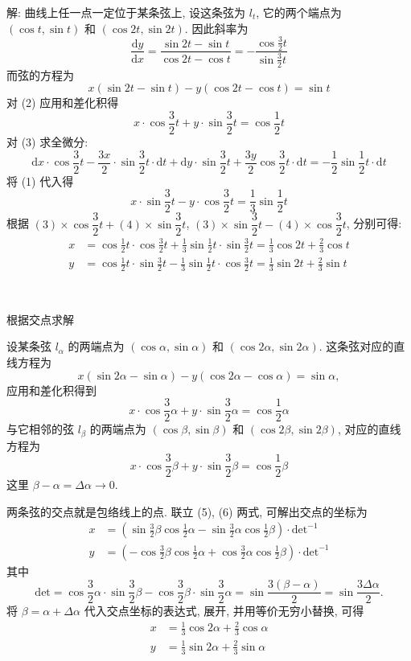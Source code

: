 解: 曲线上任一点一定位于某条弦上, 设这条弦为 $l_t$, 它的两个端点为 $(\cos t, \sin t)$ 和 $(\cos 2t, \sin 2t)$. 因此斜率为
\[ \frac{\mathrm{d}y}{\mathrm{d}x} = \frac{\sin 2t - \sin t}{\cos 2t - \cos t} = -\frac{\cos\frac{3}{2}t}{\sin\frac{3}{2}t} \tag{1}\]
而弦的方程为
\[ x(\sin 2t - \sin t) - y(\cos 2t - \cos t) = \sin t \tag{2} \]
对 (2) 应用和差化积得
\[ x\cdot\cos\frac{3}{2}t + y\cdot\sin\frac{3}{2}t = \cos\frac{1}{2}t \tag{3} \]
对 (3) 求全微分:
\[ \mathrm{d}x\cdot\cos\frac{3}{2}t -\frac{3x}{2}\cdot\sin\frac{3}{2}t\cdot \mathrm{d}t + \mathrm{d}y\cdot\sin\frac{3}{2}t + \frac{3y}{2}\cos\frac{3}{2}t\cdot \mathrm{d}t = -\frac{1}{2}\sin\frac{1}{2}t\cdot\mathrm{d}t \]
将 (1) 代入得
\[ x\cdot\sin\frac{3}{2}t - y\cdot\cos\frac{3}{2}t = \frac{1}{3}\sin\frac{1}{2}t \tag{4} \]
根据 $(3)\times \cos\dfrac{3}{2}t+(4)\times \sin\dfrac{3}{2}t$, $(3)\times \sin\dfrac{3}{2}t-(4)\times \cos\dfrac{3}{2}t$, 分别可得:
\begin{align*}
x &= \cos\frac{1}{2}t\cdot\cos\frac{3}{2}t + \frac{1}{3}\sin\frac{1}{2}t\cdot\sin\frac{3}{2}t = \frac{1}{3}\cos 2t + \frac{2}{3}\cos t \\
y &= \cos\frac{1}{2}t\cdot\sin\frac{3}{2}t - \frac{1}{3}\sin\frac{1}{2}t\cdot\cos\frac{3}{2}t = \frac{1}{3}\sin 2t + \frac{2}{3}\sin t
\end{align*}

~

\noindent 根据交点求解

设某条弦 $l_{\alpha}$ 的两端点为 $(\cos\alpha,\sin\alpha)$ 和 $(\cos 2\alpha, \sin 2\alpha)$. 这条弦对应的直线方程为
\[ x(\sin 2\alpha - \sin\alpha) - y(\cos 2\alpha - \cos\alpha) = \sin\alpha ,\]
应用和差化积得到
\[ x\cdot\cos\frac{3}{2}\alpha + y\cdot\sin\frac{3}{2}\alpha = \cos\frac{1}{2}\alpha  \tag{5} \]
与它相邻的弦 $l_{\beta}$ 的两端点为 $(\cos\beta,\sin\beta)$ 和 $(\cos 2\beta, \sin 2\beta)$, 对应的直线方程为
\[ x\cdot\cos\frac{3}{2}\beta + y\cdot\sin\frac{3}{2}\beta = \cos\frac{1}{2}\beta  \tag{6} \]
这里 $\beta - \alpha = \Delta\alpha \to 0$. 

两条弦的交点就是包络线上的点. 联立 (5), (6) 两式, 可解出交点的坐标为
\begin{align*}
x&= \left( \sin\frac{3}{2}\beta\cos\frac{1}{2}\alpha - \sin\frac{3}{2}\alpha\cos\frac{1}{2}\beta \right)\cdot\mathrm{det}^{-1} \\
y&= \left( -\cos\frac{3}{2}\beta\cos\frac{1}{2}\alpha + \cos\frac{3}{2}\alpha\cos\frac{1}{2}\beta \right)\cdot\mathrm{det}^{-1}
\end{align*}
其中 
$$\mathrm{det} = \cos\frac{3}{2}\alpha\cdot\sin\frac{3}{2}\beta - \cos\frac{3}{2}\beta\cdot\sin\frac{3}{2}\alpha = \sin\frac{3(\beta-\alpha)}{2} = \sin\frac{3\Delta\alpha}{2} .$$
将 $\beta = \alpha + \Delta\alpha$ 代入交点坐标的表达式, 展开, 并用等价无穷小替换, 可得
\begin{align*}
x &= \frac{1}{3}\cos 2\alpha + \frac{2}{3}\cos\alpha \\
y &= \frac{1}{3}\sin 2\alpha + \frac{2}{3}\sin\alpha
\end{align*}


